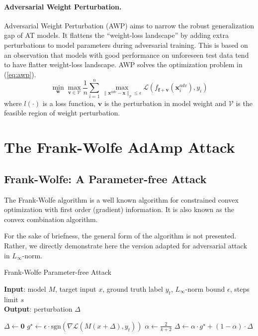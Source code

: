 \documentclass{article}
\begin{document}
    \paragraph{Adversarial Weight Perturbation.} Adversarial Weight Perturbation (AWP) \cite{wu2020adversarial} aims to narrow the robust generalization gap of AT models. It flattens the ``weight-loss landscape'' by adding extra perturbations to model parameters during adversarial training. This is based on an observation that models with good performance on unforeseen test data tend to have flatter weight-loss landscape. AWP solves the optimization problem in (\ref{eq:awp}).
    \begin{equation}\label{eq:awp}
        \min_{\mathbf{w}} \max_{\mathbf{v} \in \mathcal{V}} \frac{1}{n}\sum_{i=1}^n \max_{\|\mathbf{x}^{adv} - \mathbf{x}\|_p \le \epsilon} \mathcal{L}(f_{\mathbf{f}+\mathbf{v}}(\mathbf{x}^{adv}_i), y_i)
    \end{equation}
    where $l(\cdot)$ is a loss function, $\mathbf{v}$ is the perturbation in model weight and $\mathcal{V}$ is the feasible region of weight perturbation.


\section{The Frank-Wolfe AdAmp Attack}\label{sec:FWAdAmpAttack}
    \subsection{Frank-Wolfe: A Parameter-free Attack}
        The Frank-Wolfe algorithm \cite{frank1956algorithm} is a well known algorithm for constrained convex optimization with first order (gradient) information. It is also known as the convex combination algorithm.
        
        For the sake of briefness, the general form of the algorithm is not presented. Rather, we directly demonstrate here the version adapted for adversarial attack in $L_\infty$-norm.
        
        \begin{algorithm}[h]
            \caption{Frank-Wolfe Parameter-free Attack}
            \label{alg:FWPFA}
            \hspace*{\algorithmicindent} \textbf{Input}: model $M$, target input $x$, ground truth label $y_t$, $L_\infty$-norm bound $\epsilon$, steps limit $s$ \\
            \hspace*{\algorithmicindent} \textbf{Output}: perturbation $\Delta$
            \begin{algorithmic}[1]
                \State $\Delta \leftarrow \mathbf{0}$ 
                    \State $g^\star \leftarrow \epsilon \cdot \mathrm{sgn}\left(\nabla \mathcal{L}(M(x + \Delta), y_t)\right)$
                    \State $\alpha \leftarrow \frac{2}{k + 2}$
                    \State $\Delta \leftarrow \alpha \cdot g^\star + (1 - \alpha)\cdot\Delta$
                \EndFor
            \end{algorithmic}
        \end{algorithm}
        
\end{document}
